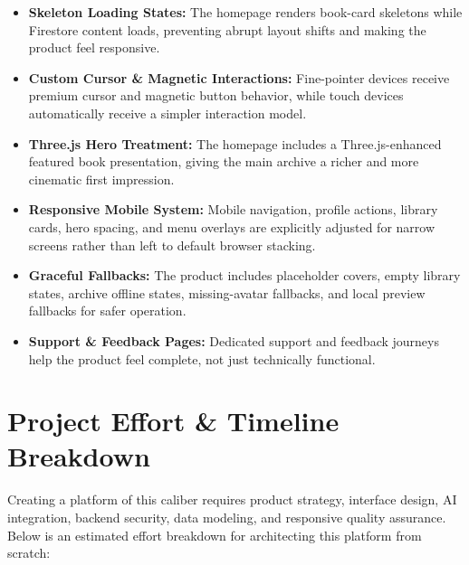 \documentclass[11pt, a4paper]{article}
\begin{document}
\begin{itemize}[label=\textcolor{abookigold}{\textbullet}]
    \item \textbf{Skeleton Loading States:} The homepage renders book-card skeletons while Firestore content loads, preventing abrupt layout shifts and making the product feel responsive.
    \item \textbf{Custom Cursor \& Magnetic Interactions:} Fine-pointer devices receive premium cursor and magnetic button behavior, while touch devices automatically receive a simpler interaction model.
    \item \textbf{Three.js Hero Treatment:} The homepage includes a Three.js-enhanced featured book presentation, giving the main archive a richer and more cinematic first impression.
    \item \textbf{Responsive Mobile System:} Mobile navigation, profile actions, library cards, hero spacing, and menu overlays are explicitly adjusted for narrow screens rather than left to default browser stacking.
    \item \textbf{Graceful Fallbacks:} The product includes placeholder covers, empty library states, archive offline states, missing-avatar fallbacks, and local preview fallbacks for safer operation.
    \item \textbf{Support \& Feedback Pages:} Dedicated support and feedback journeys help the product feel complete, not just technically functional.
\end{itemize}

\section{Project Effort \& Timeline Breakdown}
Creating a platform of this caliber requires product strategy, interface design, AI integration, backend security, data modeling, and responsive quality assurance. Below is an estimated effort breakdown for architecting this platform from scratch:
\end{document}
